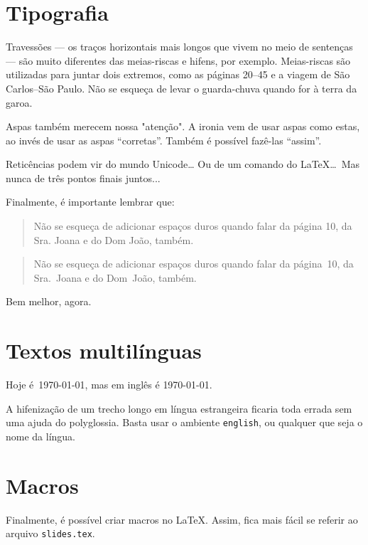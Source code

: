 \documentclass[a4paper,oneside]{article}
\newcommand{\filename}[1]{\texttt{#1}}
\begin{document}
\frenchspacing

\section{Tipografia}

Travessões --- os traços horizontais mais longos que vivem no meio de sentenças
--- são muito diferentes das meias-riscas e hifens, por exemplo. Meias-riscas
são utilizadas para juntar dois extremos, como as páginas 20--45 e a viagem de
São Carlos--São Paulo. Não se esqueça de levar o guarda-chuva quando for à
terra da garoa.

Aspas também merecem nossa "atenção". A ironia vem de usar aspas como estas, ao
invés de usar as aspas “corretas”. Também é possível fazê-las ``assim''.

Reticências podem vir do mundo Unicode… Ou de um comando do \LaTeX\ldots\ Mas
nunca de três pontos finais juntos...

Finalmente, é importante lembrar que:

\begin{quote}
  Não se esqueça de adicionar espaços duros quando falar da página 10, da
  Sra. Joana e do Dom João, também.
\end{quote}

\begin{quote}
  Não se esqueça de adicionar espaços duros quando falar da página~10, da
  Sra.~Joana e do Dom~João, também.
\end{quote}

Bem melhor, agora.

\section{Textos multilínguas}

Hoje é~\today, mas em inglês é \textenglish{\today}.

A hifenização de um trecho longo em língua estrangeira ficaria toda errada sem
uma ajuda do polyglossia. Basta usar o ambiente \verb+english+, ou qualquer que
seja o nome da língua.

\section{Macros}

Finalmente, é possível criar macros no \LaTeX. Assim, fica mais fácil se
referir ao arquivo \filename{slides.tex}.
\end{document}
